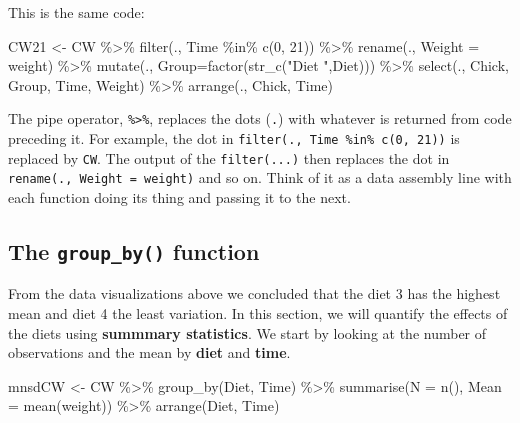 \documentclass[
]{book}
\newenvironment{Shaded}{\begin{snugshade}}{\end{snugshade}}
\newcommand{\AttributeTok}[1]{\textcolor[rgb]{0.77,0.63,0.00}{#1}}
\newcommand{\DecValTok}[1]{\textcolor[rgb]{0.00,0.00,0.81}{#1}}
\newcommand{\FunctionTok}[1]{\textcolor[rgb]{0.00,0.00,0.00}{#1}}
\newcommand{\NormalTok}[1]{#1}
\newcommand{\OtherTok}[1]{\textcolor[rgb]{0.56,0.35,0.01}{#1}}
\newcommand{\SpecialCharTok}[1]{\textcolor[rgb]{0.00,0.00,0.00}{#1}}
\newcommand{\StringTok}[1]{\textcolor[rgb]{0.31,0.60,0.02}{#1}}
\begin{document}
This is the same code:

\begin{Shaded}
\begin{Highlighting}[]
\NormalTok{CW21 }\OtherTok{\textless{}{-}}\NormalTok{ CW }\SpecialCharTok{\%\textgreater{}\%} 
  \FunctionTok{filter}\NormalTok{(., Time }\SpecialCharTok{\%in\%} \FunctionTok{c}\NormalTok{(}\DecValTok{0}\NormalTok{, }\DecValTok{21}\NormalTok{)) }\SpecialCharTok{\%\textgreater{}\%} 
  \FunctionTok{rename}\NormalTok{(., }\AttributeTok{Weight =}\NormalTok{ weight) }\SpecialCharTok{\%\textgreater{}\%} 
  \FunctionTok{mutate}\NormalTok{(., }\AttributeTok{Group=}\FunctionTok{factor}\NormalTok{(}\FunctionTok{str\_c}\NormalTok{(}\StringTok{"Diet "}\NormalTok{,Diet))) }\SpecialCharTok{\%\textgreater{}\%} 
  \FunctionTok{select}\NormalTok{(., Chick, Group, Time, Weight) }\SpecialCharTok{\%\textgreater{}\%} 
  \FunctionTok{arrange}\NormalTok{(., Chick, Time) }
\end{Highlighting}
\end{Shaded}

The pipe operator, \texttt{\%\textgreater{}\%}, replaces the dots (\texttt{.}) with whatever is returned from code
preceding it. For example, the dot in \texttt{filter(.,\ Time\ \%in\%\ c(0,\ 21))} is replaced by
\texttt{CW}. The output of the \texttt{filter(...)} then replaces the dot in
\texttt{rename(.,\ Weight\ =\ weight)} and so on. Think of it as a data assembly line with
each function doing its thing and passing it to the next.

\hypertarget{the-group_by-function}{%
\subsection{\texorpdfstring{The \texttt{group\_by()} function}{The group\_by() function}}\label{the-group_by-function}}

From the data visualizations above we concluded that the diet 3 has the highest mean
and diet 4 the least variation. In this section, we will quantify the effects of the
diets using \textbf{summmary statistics}. We start by looking at the number of observations
and the mean by \textbf{diet} and \textbf{time}.

\begin{Shaded}
\begin{Highlighting}[]
\NormalTok{mnsdCW }\OtherTok{\textless{}{-}}\NormalTok{ CW }\SpecialCharTok{\%\textgreater{}\%} 
  \FunctionTok{group\_by}\NormalTok{(Diet, Time) }\SpecialCharTok{\%\textgreater{}\%} 
  \FunctionTok{summarise}\NormalTok{(}\AttributeTok{N =} \FunctionTok{n}\NormalTok{(), }\AttributeTok{Mean =} \FunctionTok{mean}\NormalTok{(weight)) }\SpecialCharTok{\%\textgreater{}\%} 
  \FunctionTok{arrange}\NormalTok{(Diet, Time)}
\end{Highlighting}
\end{Shaded}
\end{document}
